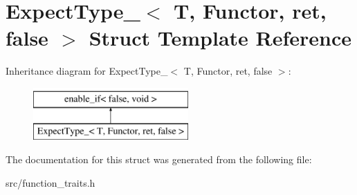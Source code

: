 \hypertarget{struct_expect_type___3_01_t_00_01_functor_00_01ret_00_01false_01_4}{\section{Expect\-Type\-\_\-$<$ T, Functor, ret, false $>$ Struct Template Reference}
\label{struct_expect_type___3_01_t_00_01_functor_00_01ret_00_01false_01_4}
}
Inheritance diagram for Expect\-Type\-\_\-$<$ T, Functor, ret, false $>$\-:\begin{figure}[H]
\begin{center}
\leavevmode
\includegraphics[height=2.000000cm]{struct_expect_type___3_01_t_00_01_functor_00_01ret_00_01false_01_4}
\end{center}
\end{figure}


The documentation for this struct was generated from the following file\-:\begin{DoxyCompactItemize}
\item 
src/function\-\_\-traits.\-h\end{DoxyCompactItemize}
